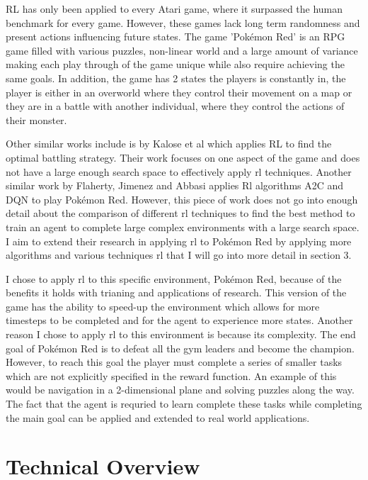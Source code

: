 \documentclass{surrey_disso_style}
\begin{document}
RL has only been applied to every Atari game, where it surpassed the human benchmark for every game. However, these games lack long term randomness and present actions influencing future states. The game 'Pokémon Red' is an RPG game filled with various puzzles, non-linear world and a large amount of variance making each play through of the game unique while also require achieving the same goals. In addition, the game has 2 states the players is constantly in, the player is either in an overworld where they control their movement on a map or they are in a battle with another individual, where they control the actions of their monster.
\par

Other similar works include is by Kalose et al \cite{kalose2018optimal} which applies RL to find the optimal battling strategy. Their work focuses on one aspect of the game and does not have a large enough search space to effectively apply rl techniques. Another similar work by Flaherty, Jimenez and Abbasi \cite{flaherty2021playing} applies Rl algorithms A2C and DQN to play Pokémon Red. However, this piece of work does not go into enough detail about the comparison of different rl techniques to find the best method to train an agent to complete large complex environments with a large search space. I aim to extend their research in applying rl to Pokémon Red by applying more algorithms and various techniques rl that I will go into more detail in section 3.
\par

I chose to apply rl to this specific environment, Pokémon Red, because of the benefits it holds with trianing and applications of research. This version of the game has the ability to speed-up the environment which allows for more timesteps to be completed and for the agent to experience more states. Another reason I chose to apply rl to this environment is because its complexity. The end goal of Pokémon Red is to defeat all the gym leaders and become the champion. However, to reach this goal the player must complete a series of smaller tasks which are not explicitly specified in the reward function. An example of this would be navigation in a 2-dimensional plane and solving puzzles along the way. The fact that the agent is requried to learn complete these tasks while completing the main goal can be applied and extended to real world applications.

\section{Technical Overview}
\end{document}
